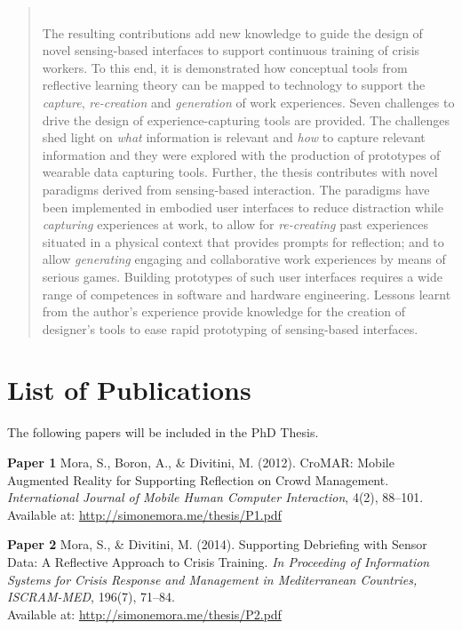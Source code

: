 \documentclass[a4paper,11pt]{article}
\begin{document}
\begin{abstract}
	\mbox{ }\\
	The resulting contributions add new knowledge to guide the design of novel sensing-based interfaces to support continuous training of crisis workers. To this end, it is demonstrated how conceptual tools from reflective learning theory can be mapped to technology to support the \emph{capture}, \emph{re-creation} and \emph{generation} of work experiences. Seven challenges to drive the design of experience-capturing tools are provided. The challenges shed light on \emph{what} information is relevant and \emph{how} to capture relevant information and they were explored with the production of prototypes of wearable data capturing tools. Further, the thesis contributes with novel paradigms derived from sensing-based interaction. The paradigms have been implemented in embodied user interfaces to reduce distraction while \emph{capturing} experiences at work, to allow for \emph{re-creating} past experiences situated in a physical context that provides prompts for reflection; and to allow \emph{generating} engaging and collaborative work experiences by means of serious games. Building prototypes of such user interfaces requires a wide range of competences in software and hardware engineering. Lessons learnt from the author's experience provide knowledge for the creation of designer's tools to ease rapid prototyping of sensing-based interfaces. 
\end{abstract}

\newpage
\section*{List of Publications}

The following papers will be included in the PhD Thesis.
\vspace{0.3cm}

\textbf{Paper 1} Mora, S., Boron, A., \& Divitini, M. (2012). CroMAR: Mobile Augmented Reality for Supporting Reflection on Crowd Management. \emph{International Journal of Mobile Human Computer Interaction}, 4(2), 88--101. \\ Available at: \href{http://simonemora.me/thesis/P1.pdf}{http://simonemora.me/thesis/P1.pdf}
\vspace{0.3cm}

\textbf{Paper 2} Mora, S., \& Divitini, M. (2014). Supporting Debriefing with Sensor Data: A Reflective Approach to Crisis Training. \emph{In Proceeding of Information Systems for Crisis Response and Management in Mediterranean Countries, ISCRAM-MED}, 196(7), 71--84. \\ Available at: \href{http://simonemora.me/thesis/P2.pdf}{http://simonemora.me/thesis/P2.pdf}
\vspace{0.3cm}
\end{document}
